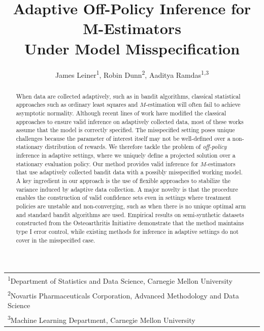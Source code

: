 \documentclass[11pt]{article}
\title{Adaptive Off-Policy Inference for M-Estimators\\ Under Model Misspecification}
\begin{document}
\author{
James Leiner\textsuperscript{1}, Robin Dunn\textsuperscript{2}, Aaditya Ramdas\textsuperscript{1,3} 
}

\maketitle
\begin{tabular}{l}
\textsuperscript{1}Department of Statistics and Data Science, Carnegie Mellon University \\
\textsuperscript{2}Novartis Pharmaceuticals Corporation, Advanced Methodology and Data Science \\
\textsuperscript{3}Machine Learning Department, Carnegie Mellon University \\
\end{tabular}

\begin{abstract}

When data are collected adaptively, such as in bandit algorithms, classical statistical approaches such as ordinary least squares and $M$-estimation will often fail to achieve asymptotic normality. Although recent lines of work have modified the classical approaches to ensure valid inference on adaptively collected data, most of these works assume that the model is correctly specified. The misspecified setting poses unique challenges because the parameter of interest itself may not be well-defined over a non-stationary distribution of rewards. We therefore tackle the problem of \emph{off-policy} inference in adaptive settings, where we uniquely define a projected solution over a stationary evaluation policy. Our method provides valid inference for $M$-estimators that use adaptively collected bandit data with a possibly misspecified working model.  A key ingredient in our approach is the use of flexible approaches to stabilize the variance induced by adaptive data collection. A major novelty is that the procedure enables the construction of valid confidence sets even in settings where treatment policies are unstable and non-converging, such as when there is no unique optimal arm and standard bandit algorithms are used. Empirical results on semi-synthetic datasets constructed from the Osteoarthritis Initiative demonstrate that the method maintains type I error control, while existing methods for inference in adaptive settings do not cover in the misspecified case. 
\end{abstract}
\end{document}
